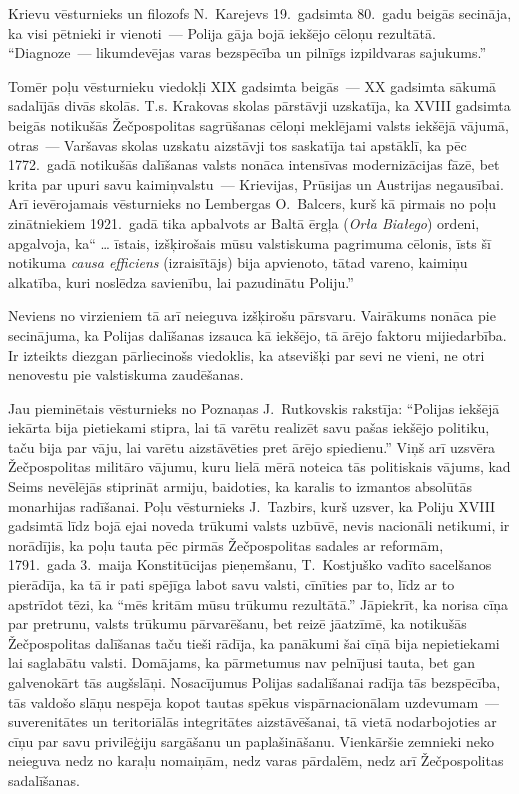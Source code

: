 \documentclass[twoside,a5paper,12pt,fleqn,openany]{extbook}
\newcommand{\pltxti}[1]{\textit{\textpolish{#1}}}
\newcommand{\latxti}[1]{\textit{\textlatin{#1}}}
\begin{document}
Krievu vēsturnieks un filozofs N.~Karejevs 19.~gadsimta 80.~gadu beigās secināja, ka visi pētnieki ir vienoti~--- Polija gāja bojā iekšējo cēloņu rezultātā. ``Diagnoze~--- likumdevējas varas bezspēcība un pilnīgs izpildvaras sajukums.''

Tomēr poļu vēsturnieku viedokļi XIX gadsimta beigās~--- XX gadsimta sākumā sadalījās divās skolās. T.s. Krakovas skolas pārstāvji uzskatīja, ka XVIII gadsimta beigās notikušās Žečpospolitas sagrūšanas cēloņi meklējami valsts iekšējā vājumā, otras~--- Varšavas skolas uzskatu aizstāvji tos saskatīja tai apstāklī, ka pēc 1772.~gadā notikušās dalīšanas valsts nonāca intensīvas modernizācijas fāzē, bet krita par upuri savu kaimiņvalstu~--- Krievijas, Prūsijas un Austrijas negausībai. Arī ievērojamais vēsturnieks no Lembergas O.~Balcers, kurš kā pirmais no poļu zinātniekiem 1921.~gadā tika apbalvots ar Baltā ērgļa (\pltxti{Orła Białego}) ordeni, apgalvoja, ka`` \dots{} īstais, izšķirošais mūsu valstiskuma pagrimuma cēlonis, īsts šī notikuma \latxti{causa efficiens} (izraisītājs) bija apvienoto, tātad vareno, kaimiņu alkatība, kuri noslēdza savienību, lai pazudinātu Poliju.''

Neviens no virzieniem tā arī neieguva izšķirošu pārsvaru. Vairākums nonāca pie secinājuma, ka Polijas dalīšanas izsauca kā iekšējo, tā ārējo faktoru mijiedarbība. Ir izteikts diezgan pārliecinošs viedoklis, ka atsevišķi par sevi ne vieni, ne otri nenovestu pie valstiskuma zaudēšanas.

Jau pieminētais vēsturnieks no Poznaņas J.~Rutkovskis rakstīja: ``Polijas iekšējā iekārta bija pietiekami stipra, lai tā varētu realizēt savu pašas iekšējo politiku, taču bija par vāju, lai varētu aizstāvēties pret ārējo spiedienu.'' Viņš arī uzsvēra Žečpospolitas militāro vājumu, kuru lielā mērā noteica tās politiskais vājums, kad Seims nevēlējās stiprināt armiju, baidoties, ka karalis to izmantos absolūtās monarhijas radīšanai. Poļu vēsturnieks J.~Tazbirs, kurš uzsver, ka Poliju XVIII gadsimtā līdz bojā ejai noveda trūkumi valsts uzbūvē, nevis nacionāli netikumi, ir norādījis, ka poļu tauta pēc pirmās Žečpospolitas sadales ar reformām, 1791.~gada 3.~maija Konstitūcijas pieņemšanu, T.~Kostjuško vadīto sacelšanos pierādīja, ka tā ir pati spējīga labot savu valsti, cīnīties par to, līdz ar to apstrīdot tēzi, ka ``mēs kritām mūsu trūkumu rezultātā.'' Jāpiekrīt, ka norisa cīņa par pretrunu, valsts trūkumu pārvarēšanu, bet reizē jāatzīmē, ka notikušās Žečpospolitas dalīšanas taču tieši rādīja, ka panākumi šai cīņā bija nepietiekami lai saglabātu valsti. Domājams, ka pārmetumus nav pelnījusi tauta, bet gan galvenokārt tās augšslāņi. Nosacījumus Polijas sadalīšanai radīja tās bezspēcība, tās valdošo slāņu nespēja kopot tautas spēkus vispārnacionālam uzdevumam~--- suverenitātes un teritoriālās integritātes aizstāvēšanai, tā vietā nodarbojoties ar cīņu par savu privilēģiju sargāšanu un paplašināšanu. Vienkāršie zemnieki neko neieguva nedz no karaļu nomaiņām, nedz varas pārdalēm, nedz arī Žečpospolitas sadalīšanas.
\end{document}

